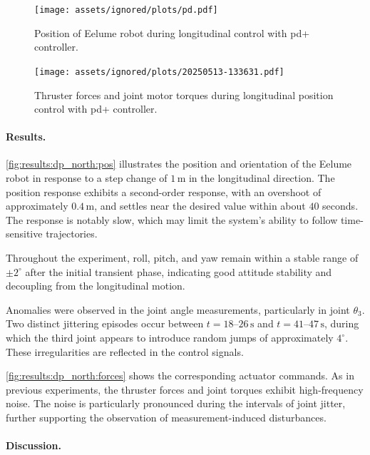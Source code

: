 \begin{figure}[!ht]
    \centering
    \texttt{[image: assets/ignored/plots/pd.pdf]}
    \caption{Position of Eelume robot during longitudinal control with \gls{pd+} controller.}
    \label{fig:results:dp_north:pos}
\end{figure}

\begin{figure}[!ht]
    \centering
    \texttt{[image: assets/ignored/plots/20250513-133631.pdf]}
    \caption{Thruster forces and joint motor torques during longitudinal position control with \gls{pd+} controller.}
    \label{fig:results:dp_north:forces}
\end{figure}

\paragraph{Results.}

\autoref{fig:results:dp_north:pos} illustrates the position and orientation of the Eelume robot in response to a step change of \(1\,\mathrm{m}\) in the longitudinal direction. The position response exhibits a second-order response, with an overshoot of approximately \(0.4\,\mathrm{m}\), and settles near the desired value within about \(40\) seconds. The response is notably slow, which may limit the system's ability to follow time-sensitive trajectories.

Throughout the experiment, roll, pitch, and yaw remain within a stable range of \(\pm 2^\circ\) after the initial transient phase, indicating good attitude stability and decoupling from the longitudinal motion.

Anomalies were observed in the joint angle measurements, particularly in joint \(\theta_3\). Two distinct jittering episodes occur between \(t = 18\text{–}26\,\mathrm{s}\) and \(t = 41\text{–}47\,\mathrm{s}\), during which the third joint appears to introduce random jumps of approximately \(4^\circ\). These irregularities are reflected in the control signals.

\autoref{fig:results:dp_north:forces} shows the corresponding actuator commands. As in previous experiments, the thruster forces and joint torques exhibit high-frequency noise. The noise is particularly pronounced during the intervals of joint jitter, further supporting the observation of measurement-induced disturbances.

\paragraph{Discussion.}

